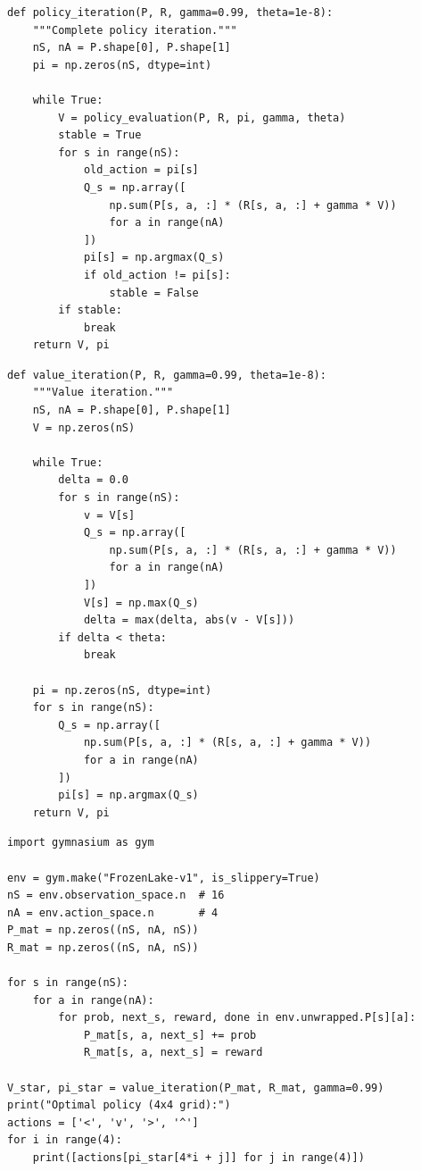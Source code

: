 \begin{codeblock}[title=\textbf{Policy Iteration}]
\begin{verbatim}
def policy_iteration(P, R, gamma=0.99, theta=1e-8):
    """Complete policy iteration."""
    nS, nA = P.shape[0], P.shape[1]
    pi = np.zeros(nS, dtype=int)

    while True:
        V = policy_evaluation(P, R, pi, gamma, theta)
        stable = True
        for s in range(nS):
            old_action = pi[s]
            Q_s = np.array([
                np.sum(P[s, a, :] * (R[s, a, :] + gamma * V))
                for a in range(nA)
            ])
            pi[s] = np.argmax(Q_s)
            if old_action != pi[s]:
                stable = False
        if stable:
            break
    return V, pi
\end{verbatim}
\end{codeblock}

\begin{codeblock}[title=\textbf{Value Iteration}]
\begin{verbatim}
def value_iteration(P, R, gamma=0.99, theta=1e-8):
    """Value iteration."""
    nS, nA = P.shape[0], P.shape[1]
    V = np.zeros(nS)

    while True:
        delta = 0.0
        for s in range(nS):
            v = V[s]
            Q_s = np.array([
                np.sum(P[s, a, :] * (R[s, a, :] + gamma * V))
                for a in range(nA)
            ])
            V[s] = np.max(Q_s)
            delta = max(delta, abs(v - V[s]))
        if delta < theta:
            break

    pi = np.zeros(nS, dtype=int)
    for s in range(nS):
        Q_s = np.array([
            np.sum(P[s, a, :] * (R[s, a, :] + gamma * V))
            for a in range(nA)
        ])
        pi[s] = np.argmax(Q_s)
    return V, pi
\end{verbatim}
\end{codeblock}

\begin{codeblock}[title=\textbf{Application to FrozenLake}]
\begin{verbatim}
import gymnasium as gym

env = gym.make("FrozenLake-v1", is_slippery=True)
nS = env.observation_space.n  # 16
nA = env.action_space.n       # 4
P_mat = np.zeros((nS, nA, nS))
R_mat = np.zeros((nS, nA, nS))

for s in range(nS):
    for a in range(nA):
        for prob, next_s, reward, done in env.unwrapped.P[s][a]:
            P_mat[s, a, next_s] += prob
            R_mat[s, a, next_s] = reward

V_star, pi_star = value_iteration(P_mat, R_mat, gamma=0.99)
print("Optimal policy (4x4 grid):")
actions = ['<', 'v', '>', '^']
for i in range(4):
    print([actions[pi_star[4*i + j]] for j in range(4)])
\end{verbatim}
\end{codeblock}

